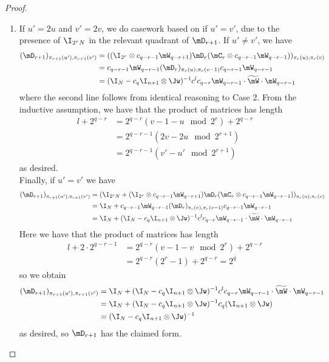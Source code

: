 \documentclass{toc}
\begin{document}
\begin{proof}
\begin{enumerate}
    \item If $u'=2u$ and $v'=2v$, we do casework based on if $u'=v'$, due to the presence of $\I_{2^rN}$ in the relevant quadrant of $\mD_{r+1}$. If $u'\neq v'$, we have
    \begin{align*}
        (\mD_{r+1})_{\pi_{r+1}(u'),\pi_{r+1}(v')}
        &= ((\I_{2^r}\otimes c_{q-r-1}\mW_{q-r+1})\mD_{r}(\mC_{r} \otimes c_{q-r-1}\mW_{q-r-1}))_{\pi_r(u),\pi_r(v)}\\
        &=   c_{q-r-1}\mW_{q-r-1}(\mD_r)_{\pi_r(u),\pi_r(v-1)}c_{q-r-1}\mW_{q-r-1}\\
        &= (\I_N-c_q\I_{n+1}\otimes\Jw)^{-1}c^{l}c_{q-r}\mW_{q-r-1}\cdot \widetilde{\mW}\cdot \mW_{q-r-1}%
    \end{align*}
    where %
    the second line follows from identical reasoning to Case 2. From the inductive assumption, we have that the product of matrices has length 
    \begin{align*}
        l+2^{q-r}&=2^{q-r}(v-1-u \mod 2^{r})+2^{q-r}\\
        &=2^{q-r-1}(2v-2u \mod 2^{r+1})\\
        &=2^{q-r-1}(v'-u' \mod 2^{r+1})
    \end{align*}
    as desired.\\
    
    Finally, if $u'=v'$ we have 
     \begin{align*}
        (\mD_{r+1})_{\pi_{r+1}(u'),\pi_{r+1}(v')} &= (\I_{2^{r}N}+(\I_{2^r}\otimes c_{q-r-1}\mW_{q-r+1})\mD_{r}(\mC_{r} \otimes c_{q-r-1}\mW_{q-r-1}))_{\pi_r(u),\pi_r(v)}\\
        &= \I_N+c_{q-r-1}\mW_{q-r-1}(\mD_r)_{\pi_r(v),\pi_r(v-1)}c_{q-r-1}\mW_{q-r-1}\\
        &= \I_N+(\I_N-c_q\I_{n+1}\otimes\Jw)^{-1}c^{l}c_{q-r}\mW_{q-r-1}\cdot \widetilde{\mW}\cdot \mW_{q-r-1}
    \end{align*}
    Here we have that the product of matrices has length 
    \begin{align*}
        l+2\cdot 2^{q-r-1} &=2^{q-r}(v-1-v \mod 2^r)+ 2^{q-r}\\
        &=2^{q-r}(2^r-1)+2^{q-r}=2^q
    \end{align*} 
    so we obtain 
    \begin{align*}
        (\mD_{r+1})_{\pi_{r+1}(u'),\pi_{r+1}(v')} &= \I_N+(\I_N-c_q\I_{n+1}\otimes\Jw)^{-1}c^{l}c_{q-r}\mW_{q-r-1}\cdot \widetilde{\mW}\cdot \mW_{q-r-1}\\
        &= \I_N+(\I_N-c_q\I_{n+1}\otimes\Jw)^{-1}c_q(\I_{n+1}\otimes\Jw)\\
        &=(\I_N-c_q\I_{n+1}\otimes\Jw)^{-1}
    \end{align*}
    as desired, so $\mD_{r+1}$ has the claimed form.
\end{enumerate}


\end{proof}
\end{document}
